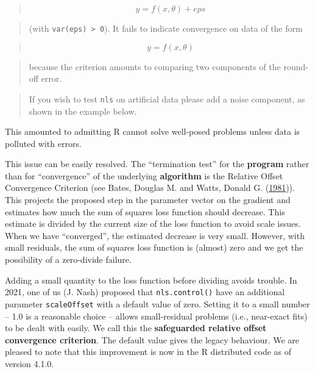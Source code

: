 \documentclass[
]{article}
\begin{document}
\begin{quote}
\[  y = f(x, \theta) + eps \]
\end{quote}

\begin{quote}
(with \texttt{var(eps)\ \textgreater{}\ 0}). It fails to indicate
convergence on data of the form
\end{quote}

\begin{quote}
\[  y = f(x, \theta)  \]
\end{quote}

\begin{quote}
because the criterion amounts to comparing two components of the
round-off error.
\end{quote}

\begin{quote}
If you wish to test \texttt{nls} on artificial data please add a noise
component, as shown in the example below.
\end{quote}

This amounted to admitting R cannot solve well-posed problems unless
data is polluted with errors.

This issue can be easily resolved. The ``termination test'' for the
\textbf{program} rather than for ``convergence'' of the underlying
\textbf{algorithm} is the Relative Offset Convergence Criterion (see
Bates, Douglas M. and Watts, Donald G.
(\protect\hyperlink{ref-BatesWatts81}{1981})). This projects the
proposed step in the parameter vector on the gradient and estimates how
much the sum of squares loss function should decrease. This estimate is
divided by the current size of the loss function to avoid scale issues.
When we have ``converged'', the estimated decrease is very small.
However, with small residuals, the sum of squares loss function is
(almost) zero and we get the possibility of a zero-divide failure.

Adding a small quantity to the loss function before dividing avoids
trouble. In 2021, one of us (J. Nash) proposed that
\texttt{nls.control()} have an additional parameter \texttt{scaleOffset}
with a default value of zero. Setting it to a small number -- 1.0 is a
reasonable choice -- allows small-residual problems (i.e., near-exact
fits) to be dealt with easily. We call this the \textbf{safeguarded
relative offset convergence criterion}. The default value gives the
legacy behaviour. We are pleased to note that this improvement is now in
the R distributed code as of version 4.1.0.
\end{document}
